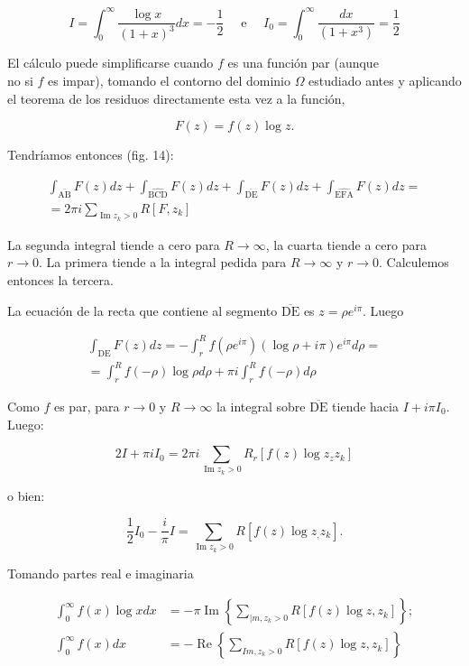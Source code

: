 \documentclass[10pt]{article}
\theoremstyle{plain}
\theoremstyle{definition}
\theoremstyle{remark}
\begin{document}
$$
I=\int_{0}^{\infty} \frac{\log x}{(1+x)^{3}} d x=-\frac{1}{2} \quad \text { e } \quad I_{0}=\int_{0}^{\infty} \frac{d x}{\left(1+x^{3}\right)}=\frac{1}{2}
$$

El cálculo puede simplificarse cuando $f$ es una función par (aunque\\
no si $f$ es impar), tomando el contorno del dominio $\Omega$ estudiado antes y aplicando el teorema de los residuos directamente esta vez a la función,

$$
F(z)=f(z) \log z .
$$

Tendríamos entonces (fig. 14):

$$
\begin{gathered}
\int_{\overline{\mathrm{AB}}} F(z) d z+\int_{\widehat{\mathrm{BCD}}} F(z) d z+\int_{\overline{\mathrm{DE}}} F(z) d z+\int_{\widehat{\mathrm{EFA}}} F(z) d z= \\
=2 \pi i \sum_{\operatorname{Im} z_{k}>0} R\left[F, z_{k}\right]
\end{gathered}
$$

La segunda integral tiende a cero para $R \rightarrow \infty$, la cuarta tiende a cero para $r \rightarrow 0$. La primera tiende a la integral pedida para $R \rightarrow \infty$ y $r \rightarrow 0$. Calculemos entonces la tercera.

La ecuación de la recta que contiene al segmento $\overline{\mathrm{DE}}$ es $z=\rho e^{i \pi}$. Luego

$$
\begin{gathered}
\int_{\mathrm{DE}} F(z) d z=-\int_{r}^{R} f\left(\rho e^{i \pi}\right)(\log \rho+i \pi) e^{i \pi} d \rho= \\
=\int_{r}^{R} f(-\rho) \log \rho d \rho+\pi i \int_{r}^{R} f(-\rho) d \rho
\end{gathered}
$$

Como $f$ es par, para $r \rightarrow 0$ y $R \rightarrow \infty$ la integral sobre $\overline{\mathrm{DE}}$ tiende hacia $I+i \pi I_{0}$. Luego:

$$
2 I+\pi i I_{0}=2 \pi i \sum_{\operatorname{Im} z_{k}>0} R_{r}\left[f(z) \log z_{z} z_{k}\right]
$$

o bien:

$$
\frac{1}{2} I_{0}-\frac{i}{\pi} I=\sum_{\operatorname{Im} z_{k}>0} R\left[f(z) \log z_{,} z_{k}\right] .
$$

Tomando partes real e imaginaria


\begin{align*}
\int_{0}^{\infty} f(x) \log x d x & =-\pi \operatorname{Im}\left\{\sum_{\mid m, z_{k}>0} R\left[f(z) \log z, z_{k}\right]\right\} ;  \tag{$27\cdot8$}\\
\int_{0}^{\infty} f(x) d x & =-\operatorname{Re}\left\{\sum_{I m, z_{k}>0} R\left[f(z) \log z, z_{k}\right]\right\} \tag{27-9}
\end{align*}
\end{document}
